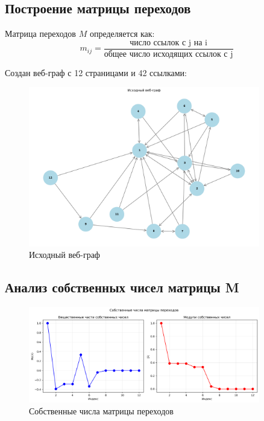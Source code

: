 \subsection*{Построение матрицы переходов}

Матрица переходов $M$ определяется как:
\begin{equation}
m_{ij} = \frac{\text{число ссылок с j на i}}{\text{общее число исходящих ссылок с j}}
\end{equation}

Создан веб-граф с 12 страницами и 42 ссылками:

\begin{figure}[H]
    \centering
    \includegraphics[width=0.9\textwidth]{images/task2/original_web_graph.png}
    \caption{Исходный веб-граф}
\end{figure}

\subsection*{Анализ собственных чисел матрицы M}

\begin{figure}[H]
    \centering
    \includegraphics[width=0.9\textwidth]{images/task2/eigenvalues.png}
    \caption{Собственные числа матрицы переходов}
\end{figure}


